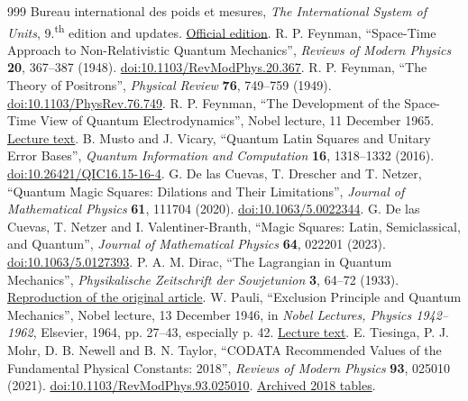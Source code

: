 \begin{thebibliography}{999}
 Bureau international des poids et mesures, \emph{The International System of Units}, 9.\textsuperscript{th} edition and updates. \href{https://www.bipm.org/en/publications/si-brochure}{Official edition}.
 R. P. Feynman, ``Space-Time Approach to Non-Relativistic Quantum Mechanics'', \emph{Reviews of Modern Physics} \textbf{20}, 367--387 (1948). \href{https://doi.org/10.1103/RevModPhys.20.367}{doi:10.1103/RevModPhys.20.367}.
 R. P. Feynman, ``The Theory of Positrons'', \emph{Physical Review} \textbf{76}, 749--759 (1949). \href{https://doi.org/10.1103/PhysRev.76.749}{doi:10.1103/PhysRev.76.749}.
 R. P. Feynman, ``The Development of the Space-Time View of Quantum Electrodynamics'', Nobel lecture, 11 December 1965. \href{https://www.nobelprize.org/prizes/physics/1965/feynman/lecture/}{Lecture text}.
 B. Musto and J. Vicary, ``Quantum Latin Squares and Unitary Error Bases'', \emph{Quantum Information and Computation} \textbf{16}, 1318--1332 (2016). \href{https://doi.org/10.26421/QIC16.15-16-4}{doi:10.26421/QIC16.15-16-4}.
 G. De las Cuevas, T. Drescher and T. Netzer, ``Quantum Magic Squares: Dilations and Their Limitations'', \emph{Journal of Mathematical Physics} \textbf{61}, 111704 (2020). \href{https://doi.org/10.1063/5.0022344}{doi:10.1063/5.0022344}.
 G. De las Cuevas, T. Netzer and I. Valentiner-Branth, ``Magic Squares: Latin, Semiclassical, and Quantum'', \emph{Journal of Mathematical Physics} \textbf{64}, 022201 (2023). \href{https://doi.org/10.1063/5.0127393}{doi:10.1063/5.0127393}.
 P. A. M. Dirac, ``The Lagrangian in Quantum Mechanics'', \emph{Physikalische Zeitschrift der Sowjetunion} \textbf{3}, 64--72 (1933). \href{https://www.informationphilosopher.com/solutions/scientists/dirac/Lagrangian_1933.pdf}{Reproduction of the original article}.
 W. Pauli, ``Exclusion Principle and Quantum Mechanics'', Nobel lecture, 13 December 1946, in \emph{Nobel Lectures, Physics 1942--1962}, Elsevier, 1964, pp. 27--43, especially p. 42. \href{https://www.nobelprize.org/uploads/2018/06/pauli-lecture.pdf}{Lecture text}.
 E. Tiesinga, P. J. Mohr, D. B. Newell and B. N. Taylor, ``CODATA Recommended Values of the Fundamental Physical Constants: 2018'', \emph{Reviews of Modern Physics} \textbf{93}, 025010 (2021). \href{https://doi.org/10.1103/RevModPhys.93.025010}{doi:10.1103/RevModPhys.93.025010}. \href{https://physics.nist.gov/cuu/Constants/ArchiveASCII/allascii_2018.txt}{Archived 2018 tables}.

\end{thebibliography}
